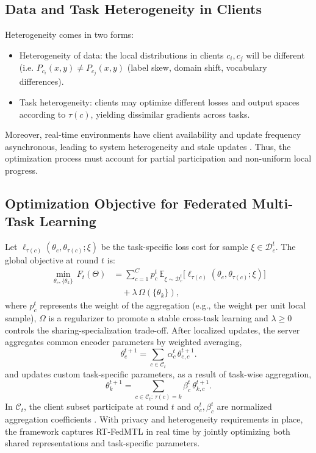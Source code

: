 \subsection{Data and Task Heterogeneity in Clients}  
Heterogeneity comes in two forms:  
\begin{itemize}  
\item Heterogeneity of data: the local distributions in clients $c_i,c_j$ will be different (i.e. $P_{c_i}(x,y)\neq P_{c_j}(x,y)$ (label skew, domain shift, vocabulary differences).  
\item Task heterogeneity: clients may optimize different losses and output spaces according to $\tau(c)$, yielding dissimilar gradients across tasks.  
\end{itemize}  
Moreover, real-time environments have client availability and update frequency asynchronous, leading to system heterogeneity and stale updates \cite{mcmahan2017fedavg,li2020fedprox,chen2024fedbone}. Thus, the optimization process must account for partial participation and non-uniform local progress.  

\subsection{Optimization Objective for Federated Multi-Task Learning}  
Let $\ell_{\tau(c)}(\theta_e,\theta_{\tau(c)};\xi)$ be the task-specific loss cost for sample $\xi\in\mathcal{D}_c^t$. The global objective at round $t$ is:  
\begin{equation}  
\begin{aligned}  
\min_{\theta_e,\{\theta_k\}} \, F_t(\Theta)  
&= \sum_{c=1}^{C} p_c^t \, \mathbb{E}_{\xi\sim\mathcal{D}_c^t}  
\big[\ell_{\tau(c)}(\theta_e,\theta_{\tau(c)};\xi)\big] \\  
&\quad + \lambda \, \Omega(\{\theta_k\}),  
\end{aligned}  
\end{equation}  
where $p_c^t$ represents the weight of the aggregation (e.g., the weight per unit local sample), $\Omega$ is a regularizer to promote a stable cross-task learning and $\lambda\ge0$ controls the sharing-specialization trade-off. After localized updates, the server aggregates common encoder parameters by weighted averaging,  
\begin{equation}  
\theta_e^{t+1} = \sum_{c\in\mathcal{C}_t} \alpha_c^t \, \theta_{e,c}^{t+1}.  
\end{equation}  
and updates custom task-specific parameters, as a result of task-wise aggregation,  
\begin{equation}  
\theta_k^{t+1} = \sum_{c\in\mathcal{C}_t: \, \tau(c)=k} \beta_c^t \, \theta_{k,c}^{t+1}.  
\end{equation}  
In $\mathcal{C}_t$, the client subset participate at round $t$ and $\alpha_c^t,\beta_c^t$ are normalized aggregation coefficients \cite{mcmahan2017fedavg,smith2017mocha,zhou2025mfed}. With privacy and heterogeneity requirements in place, the framework captures RT-FedMTL in real time by jointly optimizing both shared representations and task-specific parameters.